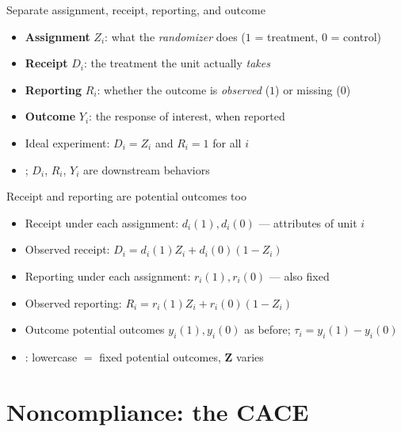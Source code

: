 \documentclass[table, xcolor = {dvipsnames}, 9pt]{beamer}
\theoremstyle{plain}
\newcommand{\mh}[1]{{\color{magenta}{#1}}}
\begin{document}
\begin{frame}[t]{Separate assignment, receipt, reporting, and outcome}
\vfill
\begin{itemize} \vfill
\item \textbf{Assignment} $Z_i$: what the \emph{randomizer} does ($1$ = treatment, $0$ = control) \vfill
\item \textbf{Receipt} $D_i$: the treatment the unit actually \emph{takes} \vfill
\item \textbf{Reporting} $R_i$: whether the outcome is \emph{observed} ($1$) or missing ($0$) \vfill
\item \textbf{Outcome} $Y_i$: the response of interest, when reported \vfill
\end{itemize} \vfill
\begin{itemize} \vfill
\item Ideal experiment: $D_i = Z_i$ and $R_i = 1$ for all $i$ \vfill
\item \mh{Only $\bm{Z}$ is randomized}; $D_i$, $R_i$, $Y_i$ are downstream behaviors \vfill
\end{itemize} \vfill
\end{frame}
\begin{frame}[t]{Receipt and reporting are potential outcomes too}
\vfill
\begin{itemize} \vfill
\item Receipt under each assignment: $d_i(1), d_i(0)$ --- \mh{fixed} attributes of unit $i$ \vfill
\item[] Observed receipt: $D_i = d_i(1) Z_i + d_i(0)\left(1 - Z_i\right)$ \vfill
\item Reporting under each assignment: $r_i(1), r_i(0)$ --- also fixed \vfill
\item[] Observed reporting: $R_i = r_i(1) Z_i + r_i(0)\left(1 - Z_i\right)$ \vfill
\item Outcome potential outcomes $y_i(1), y_i(0)$ as before; $\tau_i = y_i(1) - y_i(0)$ \vfill
\item \mh{Same logic as Day 3}: lowercase $=$ fixed potential outcomes, $\bm{Z}$ varies \vfill
\end{itemize} \vfill
\end{frame}
\section{Noncompliance: the CACE}
\end{document}
